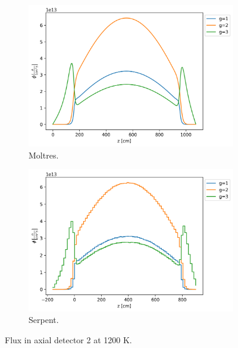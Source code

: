 \documentclass[11pt,letterpaper]{article}
\begin{document}
\begin{figure}[htbp!]
	\centering
	\begin{subfigure}[t]{0.4\textwidth}
		\centering
		\includegraphics[width=\linewidth]{figures-fullcore/3D-fullcore-1200-15Gc-axial3}
		\caption{Moltres.}
	\end{subfigure}
	\begin{subfigure}[t]{0.4\textwidth}
		\centering
		\includegraphics[width=\linewidth]{figures-fullcore/serpent26G-1200-collapse-Axial2}
		\caption{Serpent.}
	\end{subfigure}
	\hfill
	\caption{Flux in axial detector 2 at 1200 K.}
	\label{fig:fullcore-1200-axial2}
\end{figure}
\end{document}
